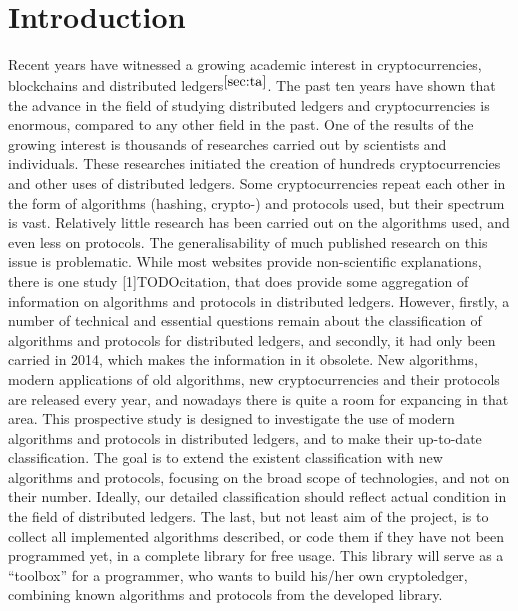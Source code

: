 \documentclass[12pt]{article}
\begin{document}
\section{Introduction}
Recent years have witnessed a growing academic interest in cryptocurrencies,
blockchains and distributed ledgers$^{\autoref{sec:ta}}$. The past ten years
have shown that the advance in the field of studying distributed ledgers and
cryptocurrencies is enormous, compared to any other field in the past. One of
the results of the growing interest is thousands of researches carried out by
scientists and individuals. These researches initiated the creation of hundreds
cryptocurrencies and other uses of distributed ledgers. Some cryptocurrencies
repeat each other in the form of algorithms (hashing, crypto-) and protocols
used, but their spectrum is vast. Relatively little research has been carried
out on the algorithms used, and even less on protocols. The generalisability of
much published research on this issue is problematic. While most websites provide
non-scientific explanations, there is one study [1]TODOcitation, that does provide
some aggregation of information on algorithms and protocols in distributed
ledgers. However, firstly, a number of technical and essential questions remain
about the classification of algorithms and protocols for distributed ledgers,
and secondly, it had only been carried in 2014, which makes the information in
it obsolete. New algorithms, modern applications of old algorithms, new
cryptocurrencies and their protocols are released every year, and nowadays
there is quite a room for expancing in that area. This prospective study is
designed to investigate the use of modern algorithms and protocols in
distributed ledgers, and to make their up-to-date classification. The goal is
to extend the existent classification with new algorithms and protocols,
focusing on the broad scope of technologies, and not on their number.
Ideally, our detailed classification should reflect actual condition in the
field of distributed ledgers. The last, but not least aim of the project, is to
collect all implemented algorithms described, or code them if they have not
been programmed yet, in a complete library for free usage. This library will
serve as a ``toolbox'' for a programmer, who wants to build his/her own
cryptoledger, combining known algorithms and protocols from the developed
library.

\end{document}
